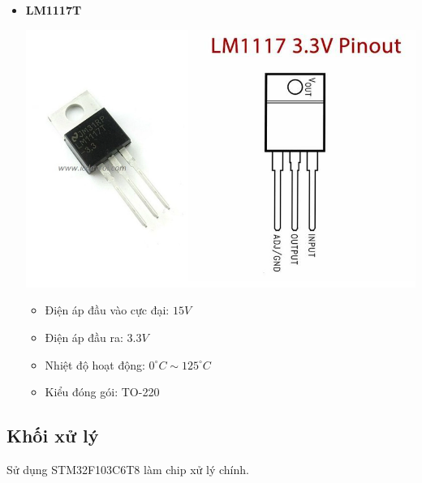 	\begin{itemize}[label= - ]
		\item \textbf{LM1117T}
		
		\begin{minipage}{0.3\linewidth}
			\includegraphics[width=\linewidth]{./picture/lm1117T.png}
		\end{minipage}
		\begin{minipage}{0.7\linewidth}
			\begin{itemize}[label = -]
				\item Điện áp đầu vào cực đại: $15V$
				\item Điện áp đầu ra: $3.3V$
				\item Nhiệt độ hoạt động: $0^{\circ}C \sim 125^{\circ}C$
				\item Kiểu đóng gói: TO-220
			\end{itemize}
		\end{minipage}
	\end{itemize}
	
	\subsection{Khối xử lý}
	Sử dụng STM32F103C6T8 làm chip xử lý chính.
	
